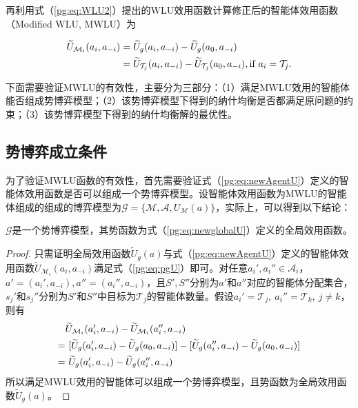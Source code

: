 再利用式（\ref{pg:eq:WLU2}）提出的WLU效用函数计算修正后的智能体效用函数（Modified WLU, MWLU）为

\begin{align}
\label{pg:eq:newAgentU}
	\widetilde U_{\mathcal{M}_i}(a_i,a_{-i}) &= \widetilde U_g(a_i,a_{-i}) - \widetilde U_g(a_0,a_{-i})\notag\\
	&= \widetilde U_{\mathcal{T}_j}(a_i,a_{-i}) - \widetilde U_{\mathcal{T}_j}(a_0,a_{-i}),\quad \text{if}\ a_i=\mathcal{T}_j.
\end{align}

下面需要验证MWLU的有效性，主要分为三部分：（1）满足MWLU效用的智能体能否组成势博弈模型；（2）该势博弈模型下得到的纳什均衡是否都满足原问题的约束；（3）该势博弈模型下得到的纳什均衡解的最优性。

\subsection{势博弈成立条件}
\label{pg:mwlu:pgcondition}
为了验证MWLU函数的有效性，首先需要验证式（\ref{pg:eq:newAgentU}）定义的智能体效用函数是否可以组成一个势博弈模型。设智能体效用函数为MWLU的智能体组成的组成的博弈模型为$\mathcal{G}=\{\mathcal{M},\mathcal{A},U_{\mathcal{M}}(a)\}$，实际上，可以得到以下结论：

\begin{proposition}[势博弈成立条件]
	$\mathcal{G}$是一个势博弈模型，其势函数为式（\ref{pg:eq:newglobalU}）定义的全局效用函数。
	
	\begin{proof}
		只需证明全局效用函数$\widetilde U_g(a)$与式（\ref{pg:eq:newAgentU}）定义的智能体效用函数$\widetilde U_{\mathcal{M}_i}(a_i,a_{-i})$满足式（\ref{pg:eq:pgU}）即可。对任意$a_i',a_i'' \in \mathcal{A}_i$，$a'=(a_i',a_{-i}),a''=(a_i'',a_{-i})$，且$S',S''$分别为$a'$和$a''$对应的智能体分配集合，$s_j'$和$s_j''$分别为$S'$和$S''$中目标为$\mathcal{T}_j$的智能体数量。假设$a_i'=\mathcal{T}_j,\ a_i''=\mathcal{T}_k,\ j\neq k$，则有
		\begin{align}
			&\widetilde U_{\mathcal{M}_i}(a_i',a_{-i}) - \widetilde U_{\mathcal{M}_i}(a_i'',a_{-i})\notag\\
			= &\ [\widetilde U_g(a_i',a_{-i}) - \widetilde U_g(a_0,a_{-i})] - [\widetilde U_g(a_i'',a_{-i}) - \widetilde U_g(a_0,a_{-i})]\notag\\
			\label{pg:pf:eq:pg} = &\ \widetilde U_g(a_i',a_{-i}) - \widetilde U_g(a_i'',a_{-i})
		\end{align}
		所以满足MWLU效用的智能体可以组成一个势博弈模型，且势函数为全局效用函数$\widetilde U_g(a)$。
	\end{proof}
\end{proposition}

